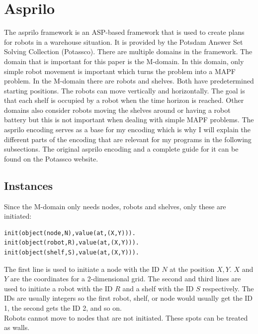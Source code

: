 \documentclass[runningheads]{llncs}
\begin{document}
\section{Asprilo}
The asprilo framework is an ASP-based framework that is used to create plans for robots in a warehouse situation. It is provided by the Potsdam Answer Set Solving Collection (Potassco). There are multiple domains in the framework. The domain that is important for this paper is the M-domain. In this domain, only simple robot movement is important which turns the problem into a MAPF problem. In the M-domain there are robots and shelves. Both have predetermined starting positions. The robots can move vertically and horizontally. The goal is that each shelf is occupied by a robot when the time horizon is reached. Other domains also consider robots moving the shelves around or having a robot battery but this is not important when dealing with simple MAPF problems. The asprilo encoding serves as a base for my encoding which is why I will explain the different parts of the encoding that are relevant for my programs in the following subsections. The original asprilo encoding and a complete guide for it can be found on the Potassco website\cite{asprilo}.
\subsection{Instances}
 Since the M-domain only needs nodes, robots and shelves, only these are initiated:
\begin{verbatim}
init(object(node,N),value(at,(X,Y))).
init(object(robot,R),value(at,(X,Y))).
init(object(shelf,S),value(at,(X,Y))).
\end{verbatim}
The first line is used to initiate a node with the ID $N$ at the position $X, Y$. $X$ and $Y$ are the coordinates for a 2-dimensional grid. The second and third lines are used to initiate a robot with the ID $R$ and a shelf with the ID $S$ respectively. The IDs are usually integers so the first robot, shelf, or node would usually get the ID 1, the second gets the ID 2, and so on. \\
Robots cannot move to nodes that are not initiated. These spots can be treated as walls.
\end{document}
